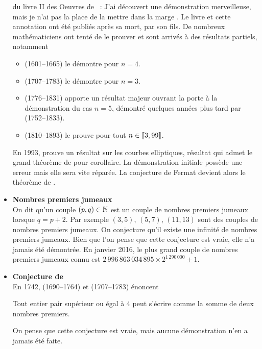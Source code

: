 \documentclass{magnolia}
\begin{document}
\begin{itemize}
  du livre {\sc II} des Oeuvres de ~: \og J'ai découvert une
  démonstration merveilleuse, mais je n'ai pas la place de la mettre dans la
  marge \fg. Le livre et cette annotation ont été publiés après sa mort, par son
  fils. De nombreux mathématiciens ont tenté de le prouver et sont arrivés
  à des résultats partiels, notamment
  \begin{itemize}
  \item {} (1601--1665) le démontre pour $n=4$.
  \item {} (1707--1783) le démontre pour $n=3$.
  \item {} (1776--1831) apporte un résultat majeur ouvrant la
    porte à la démonstration du cas $n=5$, démontré quelques années plus tard
    par  (1752--1833).
  \item {} (1810--1893) le prouve pour tout $n\in\left\llbracket 3,99\right\rrbracket$.
  \end{itemize}
  En 1993,  prouve un résultat sur les courbes elliptiques, résultat qui
  admet le grand théorème de  pour corollaire. La démonstration initiale
  possède une erreur mais elle sera vite réparée. La conjecture de Fermat
  devient alors le théorème de .
\item {\bf Nombres premiers jumeaux}\\
  On dit qu'un couple $(p,q)\in\mathbb{N}$ est un couple de nombres premiers jumeaux
  lorsque $q=p+2$. Par exemple $(3,5)$, $(5,7)$, $(11,13)$ sont des couples de
  nombres premiers jumeaux. On conjecture qu'il existe une infinité de nombres premiers jumeaux. Bien que l'on pense que cette conjecture est vraie,
  elle n'a jamais été démontrée.
  En janvier 2016, le plus grand couple de nombres premiers
  jumeaux connu est $2\,996\,863\,034\,895 \times 2^{1\,290\,000}\pm 1$.
\item {\bf Conjecture de }\\
  En 1742,  (1690--1764) et  (1707--1783) énoncent
  \medskip
  \begin{center}
  \og \parbox[t]{0.7\linewidth}{%
    Tout entier pair supérieur ou égal à 4 peut s'écrire comme la somme de
    deux nombres premiers.\fg}
  \end{center}
  \medskip
  On pense que cette conjecture est vraie, mais aucune démonstration n'en a jamais
  été faite.
\end{itemize}

\end{document}
